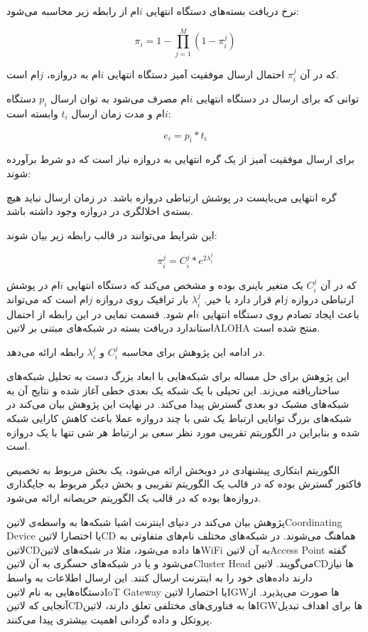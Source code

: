 نرخ دریافت بسته‌های دستگاه انتهایی $i$ام از رابطه زیر محاسبه می‌شود:

\[
  \pi_{i} = 1 - \prod_{j=1}^{M}(1 - \pi_{i}^{j})
\]

که در آن $\pi_{i}^{j}$ احتمال ارسال موفقیت آمیز دستگاه انتهایی $i$ام
به دروازه،
$j$ام است.

توانی که برای ارسال در دستگاه انتهایی $i$ام مصرف می‌شود به توان ارسال
$p_{i}$ دستگاه $i$ام و مدت زمان ارسال $t_{i}$
وابسته است:

\[
  e_{i} = p_{i} * t_{i}
\]

برای ارسال موفقیت آمیز از یک گره انتهایی به دروازه نیاز است
که دو شرط برآورده شوند:

 گره انتهایی می‌بایست در پوشش ارتباطی دروازه باشد.
 در زمان ارسال نباید هیچ بسته‌ی اخلالگری در دروازه وجود داشته باشد.

این شرایط می‌توانند در قالب رابطه زیر بیان شوند:

\[
  \pi_{i}^{j} = C_{i}^{j} * e^{2\lambda_{i}^{j}}
\]

که در آن $C_{i}^{j}$ یک متغیر باینری بوده و مشخص می‌کند که دستگاه انتهایی $i$ام
در پوشش ارتباطی دروازه
$j$ام قرار دارد یا خیر.
$\lambda_{i}^{j}$
بار ترافیک روی دروازه
$j$ام است که می‌تواند باعث ایجاد تصادم روی دستگاه انتهایی $i$ام شود.
قسمت نمایی در این رابطه از احتمال استاندارد دریافت بسته در شبکه‌های مبتنی بر
‌لاتین{ALOHA} منتج شده است.

در ادامه این پژوهش برای محاسبه $C_{i}^{j}$ و $\lambda_{i}^{j}$
رابطه ارائه می‌دهد.

این پژوهش برای حل مساله برای شبکه‌هایی با ابعاد بزرگ دست به تحلیل شبکه‌های ساختاریافته می‌زند.
این تحیلی با یک شبکه یک بعدی خطی آغاز شده و نتایج آن به شبکه‌های مشبک دو بعدی گسترش پیدا می‌کند.
در نهایت این پژوهش بیان می‌کند در شبکه‌های بزرگ توانایی ارتباط یک شی با چند دروازه عملا
باعث کاهش کارایی شبکه شده و بنابراین در الگوریتم تقریبی مورد نظر سعی بر ارتباط هر شی تنها با یک دروازه
است.

الگوریتم ابتکاری پیشنهادی در دوبخش ارائه می‌شود، یک بخش مربوط به تخصیص فاکتور گسترش بوده که در قالب یک الگوریتم تقریبی
و بخش دیگر مربوط به جایگذاری دروازه‌ها بوده که در قالب یک الگوریتم حریصانه ارائه می‌شود.


پژوهش  بیان می‌کند در دنیای اینترنت اشیا شبکه‌ها به واسطه‌ی ‌لاتین{Coordinating Device} یا اختصارا ‌لاتین{CD} هماهنگ می‌شوند.
در شبکه‌های مختلف نام‌های متفاوتی به ‌لاتین{CD}ها داده می‌شود، مثلا در شبکه‌های ‌لاتین{WiFi} به آن ‌لاتین{Access Point} گفته می‌شود و یا در شبکه‌های حسگری
به آن ‌لاتین{Cluster Head} می‌گویند.
‌لاتین{CD}ها نیاز دارند داده‌های خود را به اینترنت ارسال کنند. این ارسال اطلاعات به واسط دستگاه‌هایی به نام ‌لاتین{IoT Gateway} یا اختصارا ‌لاتین{IGW}ها
صورت می‌پذیرد.
از آنجایی که ‌لاتین{CD}ها به فناوری‌های مختلفی تعلق دارند، ‌لاتین{IGW}ها برای اهداف تبدیل پروتکل و داده گردانی اهمیت بیشتری پیدا می‌کنند.

